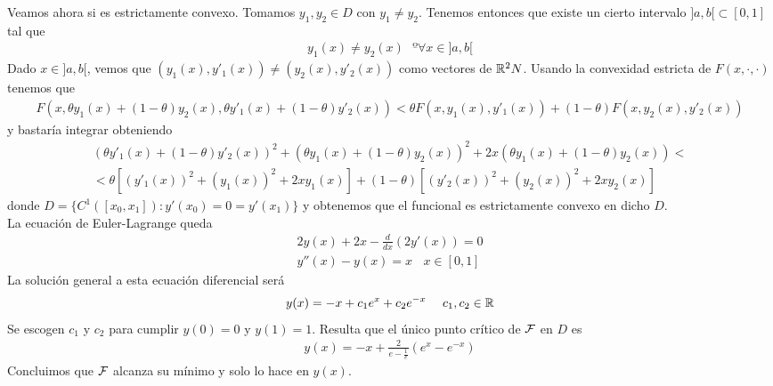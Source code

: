 \begin{ejemplo}
    Veamos ahora si es estrictamente convexo. Tomamos $y_1,y_2\in D$ con $y_1\neq y_2$. Tenemos entonces que existe un cierto intervalo $]a,b[\subset [0,1]$ tal que 
    \begin{gather*}
        y_1(x) \neq y_2(x) \ \ \ º \forall x \in ]a,b[
    \end{gather*}
    Dado $x\in ]a,b[$, vemos que $(y_1(x), y'_1(x)) \neq (y_2(x), y'_2(x))$ como vectores de $\mathbb{R}^2N$. Usando la convexidad estricta de $F(x,\cdot,\cdot)$ tenemos que 
    \begin{gather*}
        F(x, \theta y_1(x)+ (1-\theta) y_2(x), \theta y'_1(x)+ (1-\theta) y'_2(x)) < \theta F(x,y_1(x),y'_1(x)) + (1-\theta) F(x,y_2(x),y'_2(x))
    \end{gather*}
    y bastaría integrar obteniendo 
    \begin{gather*}
        (\theta y'_1(x) + (1-\theta)y'_2(x))^2 + (\theta y_1(x) + (1-\theta)y_2(x))^2 + 2x (\theta y_1(x) + (1-\theta) y_2(x)) <\\
        < \theta[(y'_1(x))^2 + (y_1(x))^2 + 2xy_1(x) ] + (1-\theta)[(y'_2(x))^2 + (y_2(x))^2 + 2xy_2(x) ]
    \end{gather*}
    donde $D=\{C^1([x_0, x_1]) : y'(x_0) = 0 = y'(x_1)\}$ y obtenemos que el funcional es estrictamente convexo en dicho $D$.\\

    La ecuación de Euler-Lagrange queda
    \begin{gather*}
        2y(x) + 2x - \frac{d}{dx}(2y'(x)) = 0\\
        y''(x) - y(x) = x \ \ \ \ x\in[0,1]
    \end{gather*}
    La solución general a esta ecuación diferencial será
    \begin{gather*}
        y(x) = -x + c_1e^x + c_2 e^{-x} \ \ \ \ c_1,c_2\in \mathbb{R}
    \end{gather*}
    Se escogen $c_1$ y $c_2$ para cumplir $y(0)=0$ y $y(1)=1$. Resulta que el único punto crítico de $\mathcal{F}$ en $D$ es 
    \begin{gather*}
        y(x) = -x + \frac{2}{e - \frac{1}{e}} (e^x - e^{-x})
    \end{gather*}
    Concluimos que $\mathcal{F}$ alcanza su mínimo y solo lo hace en $y(x)$.
\end{ejemplo}

